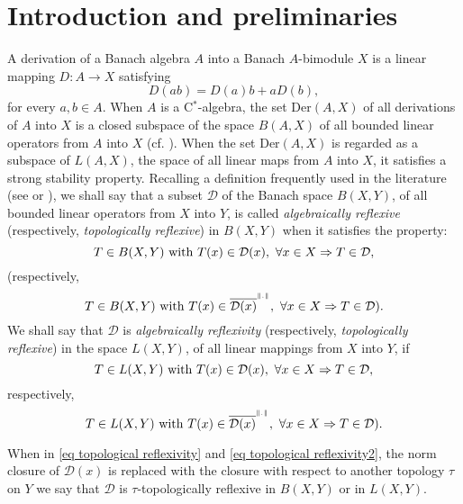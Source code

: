 \documentclass[11pt]{amsart}
\begin{document}
\section{Introduction and preliminaries}

A derivation of a Banach algebra $A$ into a Banach $A$-bimodule $X$ is a linear mapping $D: A\to X$ satisfying $$D(a b) = D(a) b + a D(b),$$ for every $a,b\in A$. When $A$ is a C$^*$-algebra, the set Der$(A,X)$ of all derivations of $A$ into $X$ is a closed subspace of the space $B(A,X)$ of all bounded linear operators from $A$ into $X$ (cf. \cite{Ringrose72}). When the set Der$(A,X)$ is regarded as a subspace of $L(A,X)$, the space of all linear maps from $A$ into $X$, it satisfies a strong stability property. Recalling a definition frequently used in the literature (see \cite{KOPR2014} or \cite{BattMol}), we shall say that a subset $\mathcal{D}$ of the Banach space $B(X,Y)$, of all bounded linear operators from $X$ into $Y$, is called \emph{algebraically reflexive} (respectively, \emph{topologically reflexive}) in $B(X,Y)$ when it satisfies the property:
\begin{equation}\label{eq reflexivity} T\in B(X,Y) \hbox{ with } T(x)\in \mathcal{D} (x), \ \forall x\in X \Rightarrow T\in \mathcal{D},
\end{equation}
(respectively,
\begin{equation}\label{eq topological reflexivity} T\in B(X,Y) \hbox{ with } T(x)\in \overline{\mathcal{D} (x)}^{^{\|.\|}}, \ \forall x\in X \Rightarrow T\in \mathcal{D}).
\end{equation}
We shall say that ${\mathcal D}$ is \emph{algebraically reflexivity} (respectively, \emph{topologically reflexive}) in the space $L(X,Y)$, of all linear mappings from $X$ into $Y$, if
\begin{equation}\label{eq reflexivity2} T\in L(X,Y) \hbox{ with } T(x)\in \mathcal{D} (x), \ \forall x\in X \Rightarrow T\in \mathcal{D},
\end{equation}
respectively,
\begin{equation}\label{eq topological reflexivity2} T\in L(X,Y) \hbox{ with } T(x)\in \overline{\mathcal{D} (x)}^{^{\|.\|}}, \ \forall x\in X \Rightarrow T\in \mathcal{D}).
\end{equation}

When in \eqref{eq topological reflexivity} and \eqref{eq topological reflexivity2}, the norm closure of $\mathcal{D} (x)$ is replaced with the closure with respect to another topology $\tau$ on $Y$ we  say that $\mathcal{D}$ is $\tau$-topologically reflexive in $B(X,Y)$ or in $L(X,Y)$.\smallskip
\end{document}
